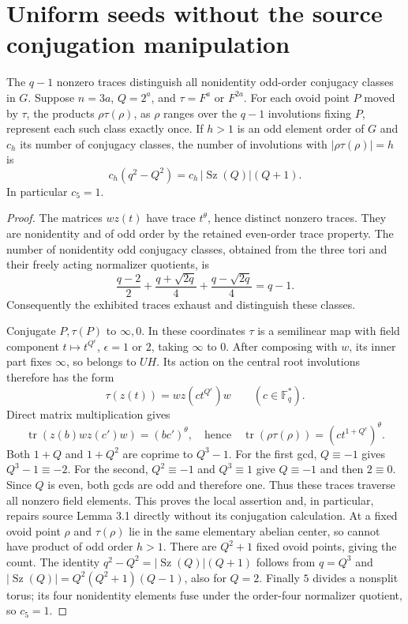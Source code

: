 \documentclass[11pt,a4paper]{article}
\newcommand{\Sz}{\operatorname{Sz}}\newcommand{\Aut}{\operatorname{Aut}}\newcommand{\gen}[1]{\langle#1\rangle}
\begin{document}
\section{Uniform seeds without the source conjugation manipulation}
\begin{lemma}\label{seed}
The $q-1$ nonzero traces distinguish all nonidentity odd-order conjugacy
classes in $G$. Suppose $n=3a$, $Q=2^a$, and $\tau=F^a$ or $F^{2a}$.
For each ovoid point $P$ moved by $\tau$, the products
$\rho\tau(\rho)$, as $\rho$ ranges over the $q-1$ involutions fixing $P$,
represent each such class exactly once.
If $h>1$ is an odd element order of $G$ and $c_h$ its number of conjugacy
classes, the number of involutions with $|\rho\tau(\rho)|=h$ is
\[
 c_h(q^2-Q^2)=c_h\,|\Sz(Q)|(Q+1).
\]
In particular $c_5=1$.
\end{lemma}
\begin{proof}
The matrices $wz(t)$ have trace $t^\theta$, hence distinct nonzero traces.
They are nonidentity and of odd order by the retained even-order trace
property. The number of nonidentity odd conjugacy classes, obtained from
the three tori and their freely acting normalizer quotients, is
\[
 \frac{q-2}{2}+\frac{q+\sqrt{2q}}4+
 \frac{q-\sqrt{2q}}4=q-1.
\]
Consequently the exhibited traces exhaust and distinguish these classes.

Conjugate $P,\tau(P)$ to $\infty,0$. In these coordinates $\tau$ is a
semilinear map with field component $t\mapsto t^{Q^\epsilon}$,
$\epsilon=1$ or $2$, taking $\infty$ to $0$. After composing with $w$,
its inner part fixes $\infty$, so belongs to $U H$. Its action on the
central root involutions therefore has the form
\[
 \tau(z(t))=wz(c t^{Q^\epsilon})w\qquad(c\in\mathbb F_q^*).
\]
Direct matrix multiplication gives
\[
 \operatorname{tr}(z(b)wz(c')w)=(bc')^\theta,
 \quad\text{hence}\quad
 \operatorname{tr}(\rho\tau(\rho))=(c t^{1+Q^\epsilon})^\theta.
\]
Both $1+Q$ and $1+Q^2$ are coprime to $Q^3-1$. For the first gcd,
$Q\equiv-1$ gives $Q^3-1\equiv-2$. For the second,
$Q^2\equiv-1$ and $Q^3\equiv1$ give $Q\equiv-1$ and then
$2\equiv0$. Since $Q$ is even, both gcds are odd and therefore one.
Thus these traces traverse all nonzero field elements. This proves the local assertion and, in particular,
repairs source Lemma 3.1 directly without its conjugation calculation.
At a fixed ovoid point $\rho$ and $\tau(\rho)$ lie in the same elementary
abelian center, so cannot have product of odd order $h>1$.
There are $Q^2+1$ fixed ovoid points, giving the count. The identity
$q^2-Q^2=|\Sz(Q)|(Q+1)$ follows from $q=Q^3$ and
$|\Sz(Q)|=Q^2(Q^2+1)(Q-1)$, also for $Q=2$.
Finally $5$ divides a nonsplit torus; its four nonidentity elements fuse
under the order-four normalizer quotient, so $c_5=1$.
\end{proof}
\end{document}
